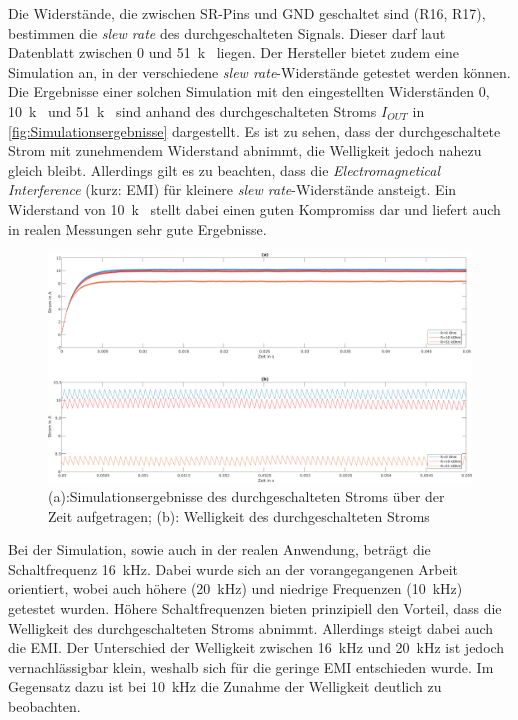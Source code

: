 Die Widerstände, die zwischen SR-Pins und GND geschaltet sind (R16, R17), bestimmen die \textit{slew rate} des durchgeschalteten Signals. Dieser darf laut Datenblatt zwischen \SI{0}{\Omega} und \SI{51}{k\Omega} liegen. Der Hersteller bietet zudem eine Simulation an, in der verschiedene \textit{slew rate}-Widerstände getestet werden können. Die Ergebnisse einer solchen Simulation mit den eingestellten Widerständen \SI{0}{\Omega}, \SI{10}{k\Omega} und \SI{51}{k\Omega} sind anhand des durchgeschalteten Stroms $I_{OUT}$ in \autoref{fig:Simulationsergebnisse} dargestellt. Es ist zu sehen, dass der durchgeschaltete Strom mit zunehmendem Widerstand abnimmt, die Welligkeit jedoch nahezu gleich bleibt. Allerdings gilt es zu beachten, dass die \textit{Electromagnetical Interference} (kurz: EMI) für kleinere \textit{slew rate}-Widerstände ansteigt. Ein Widerstand von \SI{10}{k\Omega} stellt dabei einen guten Kompromiss dar und liefert auch in realen Messungen sehr gute Ergebnisse.
\begin{figure} [H]
	\centering
	\includegraphics[width=1\linewidth]{Bilder/Simulationsergebnisse.pdf}
	\caption{(a):Simulationsergebnisse des durchgeschalteten Stroms über der Zeit aufgetragen; (b): Welligkeit des durchgeschalteten Stroms}
	\label{fig:Simulationsergebnisse}
\end{figure}\noindent
Bei der Simulation, sowie auch in der realen Anwendung, beträgt die Schaltfrequenz \SI{16}{kHz}. Dabei wurde sich an der vorangegangenen Arbeit orientiert, wobei auch höhere (\SI{20}{kHz}) und niedrige Frequenzen (\SI{10}{kHz}) getestet wurden. Höhere Schaltfrequenzen bieten prinzipiell den Vorteil, dass die Welligkeit des durchgeschalteten Stroms abnimmt. Allerdings steigt dabei auch die EMI. Der Unterschied der Welligkeit zwischen \SI{16}{kHz} und \SI{20}{kHz} ist jedoch vernachlässigbar klein, weshalb sich für die geringe EMI entschieden wurde. Im Gegensatz dazu ist bei \SI{10}{kHz} die Zunahme der Welligkeit deutlich zu beobachten.  

